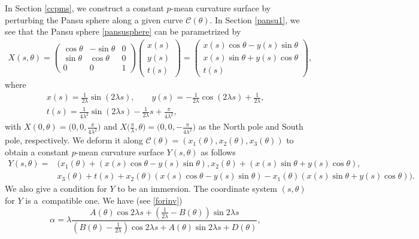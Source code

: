\documentclass[pdftex]{sigma}
\numberwithin{equation}{section}
\begin{document}
In Section \ref{ccpms}, we construct a constant $p$-mean curvature surface by perturbing the Pansu sphere along a given curve $\mathcal{C}(\theta)$. In Section \ref{pansu1}, we see that the Pansu sphere \eqref{pansusphere} can be parametrized by
\begin{gather*} %
X(s,\theta)= \left(
\begin{matrix}
\cos \theta & -\sin \theta & 0 \\
\sin \theta & \cos \theta & 0 \\
0 & 0 & 1
\end{matrix}
\right)\left(
\begin{matrix}
x(s) \\
y(s) \\
t(s)
\end{matrix}
\right)=\left(
\begin{matrix}
x(s)\cos \theta-y(s)\sin \theta \\
x(s)\sin \theta+y(s)\cos \theta \\
t(s)
\end{matrix}
\right),
\end{gather*}
where
\begin{gather*} %
x(s) = \frac{1}{2\lambda}\sin(2\lambda s),\qquad
y(s) = -\frac{1}{2\lambda}\cos(2\lambda s)+ \frac{1}{2\lambda},\\
t(s) = \frac{1}{4\lambda^2}\sin(2\lambda s)- \frac{1}{2\lambda}s+\frac{\pi}{4\lambda^2},
\end{gather*}
with $X(0,\theta)=\bigl(0,0,\frac{\pi}{4\lambda^2}\bigr)$ and $X\bigl(\frac{\pi}{\lambda},\theta\bigr)=\bigl(0,0,-\frac{\pi}{4\lambda^2}\bigr)$ as the North pole and South pole, respectively.
We deform it along $\mathcal{C}(\theta)=(x_{1}(\theta), x_{2}(\theta), x_{3}(\theta))$ to obtain a constant $p$-mean curvature surface $Y(s,\theta)$ as follows
\begin{align*} %
Y(s,\theta)={}&(x_{1}(\theta)+(x(s)\cos{\theta}-y(s)\sin{\theta}),x_{2}(\theta)+(x(s)\sin{\theta}+y(s)\cos{\theta}), \\
&x_{3}(\theta)+t(s)+x_{2}(\theta)(x(s)\cos{\theta}-y(s)\sin{\theta})
-x_{1}(\theta)(x(s)\sin{\theta}+y(s)\cos{\theta})).
\end{align*}
We also give a condition for $Y$ to be an immersion. The coordinate system $(s,\theta)$ for $Y$
is a~compatible one. We have (see \eqref{forinv})
\begin{equation}\label{forinvi}
\alpha =\lambda \frac{A(\theta )\cos {2\lambda s}+\left( \frac{1}{2\lambda }-B(\theta )\right) \sin {2\lambda s}}{\left( B(\theta )-\frac{1}{2\lambda }\right) \cos {2\lambda s}+A(\theta )\sin {2\lambda s}+D(\theta )},
\end{equation}
\end{document}
